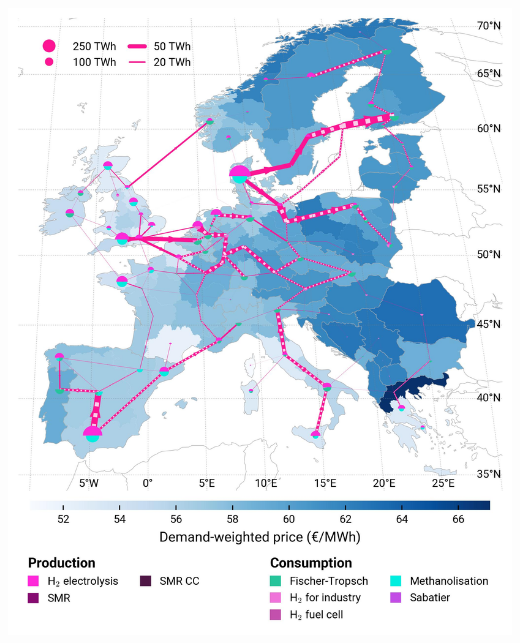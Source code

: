 \documentclass[a0,portrait]{a0poster}
\begin{document}
\begin{multicols}{3}
\begin{center}
    \includegraphics[width=\linewidth]{base_s_adm___2050-balance_map_H2.jpg}
    \label{fig:PCI-in_lt_2050_h2}
\end{center}







\end{multicols}
\end{document}
